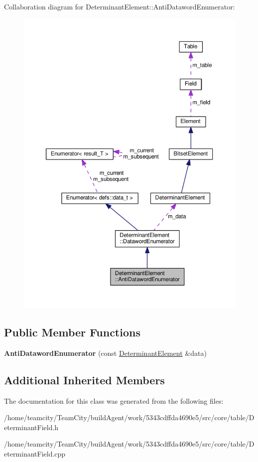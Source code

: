 Collaboration diagram for Determinant\+Element\+:\+:Anti\+Dataword\+Enumerator\+:\nopagebreak
\begin{figure}[H]
\begin{center}
\leavevmode
\includegraphics[width=350pt]{classDeterminantElement_1_1AntiDatawordEnumerator__coll__graph}
\end{center}
\end{figure}
\subsection*{Public Member Functions}
\begin{DoxyCompactItemize}
\item 
{\bfseries Anti\+Dataword\+Enumerator} (const \hyperlink{classDeterminantElement}{Determinant\+Element} \&data)\hypertarget{classDeterminantElement_1_1AntiDatawordEnumerator_a09e78d2e57f66b5b7186ac7979c877ba}{}\label{classDeterminantElement_1_1AntiDatawordEnumerator_a09e78d2e57f66b5b7186ac7979c877ba}

\end{DoxyCompactItemize}
\subsection*{Additional Inherited Members}


The documentation for this class was generated from the following files\+:\begin{DoxyCompactItemize}
\item 
/home/teamcity/\+Team\+City/build\+Agent/work/5343cdffda4690e5/src/core/table/Determinant\+Field.\+h\item 
/home/teamcity/\+Team\+City/build\+Agent/work/5343cdffda4690e5/src/core/table/Determinant\+Field.\+cpp\end{DoxyCompactItemize}
